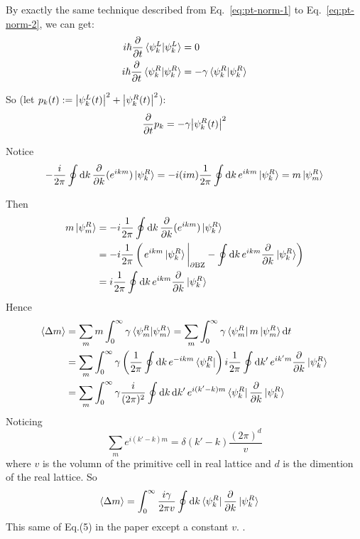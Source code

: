 \documentclass{article}
\begin{document}
By exactly the same technique described from Eq.~\ref{eq:pt-norm-1} to
Eq.~\ref{eq:pt-norm-2}, we can get:
\begin{align*}
    i\hbar\frac{\partial }{\partial t}\braket{\psi^L_k|\psi^L_k} &= 0
    \\
    i\hbar\frac{\partial }{\partial t}\braket{\psi^R_k|\psi^R_k} &= 
        -\gamma\braket{\psi^R_k|\psi^R_k}
\end{align*}

So (let $p_k(t):=\abs{\psi^L_k(t)}^2+\abs{\psi^R_k(t)}^2$):
\begin{equation}
    \frac{\partial }{\partial t}p_k = -\gamma\abs{\psi^R_k(t)}^2
    \label{eq:pt-pk}
\end{equation}

Notice
\begin{equation*}
    -\frac{i}{2\pi}\oint \dd{k} 
    \frac{\partial }{\partial k}(e^{ikm})\ket{\psi^R_k}
    =-i (im) \frac{1}{2\pi}\oint\dd{k} e^{ikm}\ket{\psi^R_k}
    =m\ket{\psi^R_m}
\end{equation*}

Then
\begin{align*}
    m\ket{\psi^R_m} &= -i \frac{1}{2\pi}\oint\dd{k}
    \frac{\partial }{\partial k}(e^{ikm})\ket{\psi^R_k}
    \\
    &=-i\frac{1}{2\pi}\left(
        \eval{e^{ikm}\ket{\psi^R_k}}_{\partial\textrm{BZ}}
        -\oint\dd{k} e^{ikm}\frac{\partial }{\partial k}\ket{\psi^R_k}
    \right)
    \\
    &= i\frac{1}{2\pi}\oint\dd{k}e^{ikm}\frac{\partial }{\partial k}
    \ket{\psi^R_k}
\end{align*}
Hence
\begin{align}
    \braket{\Delta m} &= \sum_m m\int_0^\infty
    \gamma\braket{\psi^R_m|\psi^R_m} 
    = \sum_m \int_0^\infty \gamma
    \bra{\psi^R_m} m\ket{\psi^R_m} \dd t
    \\
    &= \sum_m \int_0^\infty \gamma
    \left(\frac{1}{2\pi}\oint\dd{k} e^{-ikm}\bra{\psi^R_k}\right)
    i\frac{1}{2\pi}\oint\dd{k'}e^{ik'm}\frac{\partial }{\partial k}
        \ket{\psi^R_k} \\
    &= \sum_m \int_0^\infty \gamma
    \frac{i}{(2\pi)^2}\oint\dd{k}\dd{k'} e^{i(k'-k)m}
    \bra{\psi^R_k}\frac{\partial }{\partial k}\ket{\psi^R_k}
\end{align}
Noticing
\begin{equation}
    \sum_m e^{i(k'-k)m} = \delta(k'-k)\frac{(2\pi)^d}{v}
\end{equation}
where $v$ is the volumn of the primitive cell in real lattice and $d$
is the dimention of the real lattice.
So
\begin{align}
    \braket{\Delta m}
    &= \int_0^\infty \frac{i\gamma}{2\pi v}
    \oint\dd{k} \bra{\psi^R_k}
        \frac{\partial }{\partial k}\ket{\psi^R_k}
\end{align}
This same of Eq.(5) in the paper except a constant $v$.
\label{confusion:2}.
\end{document}
